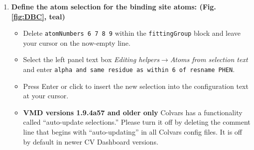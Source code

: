 \documentclass[9pt,tutorial]{Styling/livecoms}
\newcommand{\button}[1]{\inlineBox[gray]{\texttt{#1}}}
\newcommand{\menu}[1]{\textit{#1}}
\newcommand{\textInput}[1]{\texttt{#1}}
\begin{document}
\begin{enumerate}
\begin{enumerate}[label=\alph*., ref=\theenumi.\alph*]
            \item \label{step:siteNumbers}\textbf{Define the atom selection for the binding site atoms: (Fig. \ref{fig:DBC}, teal)} 
             \begin{itemize}
                 \item Delete \textInput{atomNumbers 6 7 8 9} within the \textInput{fittingGroup} block and leave your cursor on the now-empty line.
                 \item Select the left panel text box \menu{Editing helpers$\rightarrow$Atoms from selection text} and enter \textInput{alpha and same residue as within 6 of resname PHEN}.
                 \item Press Enter or click \button{Insert [Enter]} to insert the new selection into the configuration text at your cursor.
                 \item \textbf{VMD versions 1.9.4a57 and older only} Colvars has a functionality called ``auto-update selections.'' Please turn it off by deleting the comment line that begins with ``auto-updating'' in all Colvars config files. It is off by default in newer CV Dashboard versions.
            \end{itemize}
        

\end{enumerate}
\end{enumerate}
\end{document}
